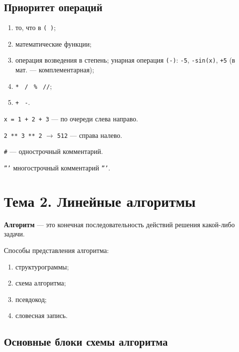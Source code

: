 \documentclass[a4paper, 12pt]{article}
\begin{document}
\subsection{Приоритет операций}

\begin{enumerate}[noitemsep, label=\arabic*)]
  \item то, что в \texttt{( )};
  \item математические функции;
  \item[3--4)] операция возведения в степень; унарная операция \texttt{(-)}:
    \texttt{-5}, \texttt{-sin(x)}, \texttt{+5} (в мат. --- комплементарная); %
  \item[5)] \texttt{*} \ \texttt{/} \ \texttt{\%} \ \texttt{//};
  \item[6)] \texttt{+} \ \texttt{-}.
\end{enumerate}

\texttt{x = 1 + 2 + 3} --- по очереди слева направо.

\texttt{2 ** 3 ** 2} $\to$ \texttt{512} --- справа налево.

\texttt{\#} --- однострочный комментарий.

\texttt{'''} многострочный комментарий \texttt{'''}.

\section{Тема 2. Линейные алгоритмы}

\textbf{Алгоритм} --- это конечная последовательность действий решения
какой-либо задачи.

Способы представления алгоритма:
\begin{enumerate}[noitemsep]
  \item структурограммы;
  \item схема алгоритма;
  \item псевдокод;
  \item словесная запись.
\end{enumerate}

\subsection{Основные блоки схемы алгоритма}
\end{document}
